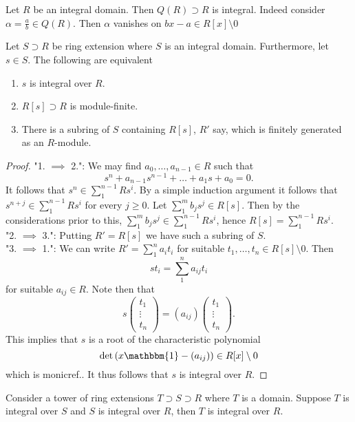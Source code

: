 \begin{example}
    Let $R$ be an integral domain. Then $Q(R)\supset R$ is integral. Indeed consider $\alpha=\frac{a}{b}\in Q(R)$. Then $\alpha$ vanishes on $bx-a\in R[x]\setminus 0$ 
\end{example}
\begin{lemma}\label{EquivalentFormulationsOfIntegralElements}
    Let $S\supset R$ be ring extension where $S$ is an integral domain. Furthermore, let $s\in S$. The following are equivalent
    \begin{enumerate}
        \item $s$ is integral over $R$.
        \item $R[s]\supset R$ is module-finite.
        \item There is a subring of $S$ containing $R[s]$, $R'$ say, which is finitely generated as an $R$-module.   
    \end{enumerate}
\end{lemma}
\begin{proof}
    "1. $\implies$ 2.": We may find $a_0,\dots,a_{n-1}\in R$ such that 
    $$s^n+a_{n-1}s^{n-1}+\dots+ a_1s+ a_0 = 0.$$
    It follows that $s^n \in \sum_1^{n-1} Rs^i$. By a simple induction argument it follows that $s^{n+j}\in \sum_1^{n-1} Rs^i$ for every $j\geq 0$. Let $\sum_1^m b_js^j\in R[s]$. Then by the considerations prior to this, $\sum_1^m b_js^j\in \sum_1^{n-1} Rs^i$, hence $R[s]=\sum_1^{n-1} Rs^{i}$.\\
    "2. $\implies$ 3.": Putting $R' = R[s]$ we have such a subring of $S$.\\
    "3. $\implies$ 1.": We can write $R'=\sum_1^n a_it_i$ for suitable $t_1,\dots,t_n\in R[s]\setminus 0$. Then 
    $$st_i = \sum_1^n a_{ij}t_i$$
    for suitable $a_{ij}\in R$. Note then that 
    $$s\begin{pmatrix} t_1\\ \vdots \\ t_n\end{pmatrix} = (a_{ij}) \begin{pmatrix} t_1\\ \vdots \\ t_n\end{pmatrix}.$$
    This implies that $s$ is a root of the characteristic polynomial 
    $$\det\left( x\mathbbm{1} - (a_{ij})\right) \in R[x]\setminus 0$$
    which is monic{\LARGE ref.}. It thus follows that $s$ is integral over $R$. 
\end{proof}
\begin{lemma}
    Consider a tower of ring extensions $T\supset S\supset R$ where $T$ is a domain. Suppose $T$ is integral over $S$ and $S$ is integral over $R$, then $T$ is integral over $R$. 
\end{lemma}
